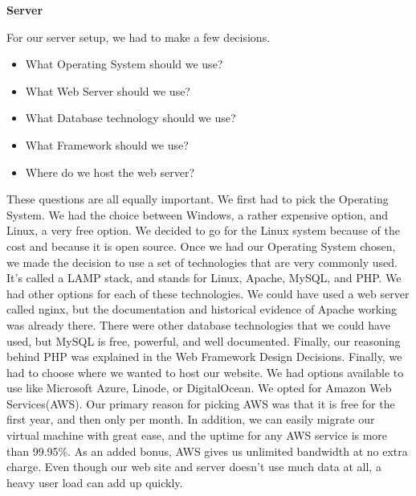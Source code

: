 \documentclass{report}
\begin{document}
\begin{center}
	\textbf{Server}
\end{center}
\indent
For our server setup, we had to make a few decisions.
\begin{itemize}
	\item What Operating System should we use?
	\item What Web Server should we use?
	\item What Database technology should we use?
	\item What Framework should we use?
	\item Where do we host the web server?
\end{itemize}
\indent
These questions are all equally important. We first had to pick the Operating System. We had the choice between Windows, a rather expensive option, and Linux, a very free option. We decided to go for the Linux system because of the cost and because it is open source.
\newline
\indent
Once we had our Operating System chosen, we made the decision to use a set of technologies that are very commonly used. It's called a LAMP stack, and stands for Linux, Apache, MySQL, and PHP. We had other options for each of these technologies. We could have used a web server called nginx, but the documentation and historical evidence of Apache working was already there. There were other database technologies that we could have used, but MySQL is free, powerful, and well documented. Finally, our reasoning behind PHP was explained in the Web Framework Design Decisions.
\newline
\indent
Finally, we had to choose where we wanted to host our website. We had options available to use like Microsoft Azure, Linode, or DigitalOcean. We opted for Amazon Web Services(AWS).
\newline
\indent
Our primary reason for picking AWS was that it is free for the first year, and then only  per month. In addition, we can easily migrate our virtual machine with great ease, and the uptime for any AWS service is more than 99.95\%. As an added bonus, AWS gives us unlimited bandwidth at no extra charge. Even though our web site and server doesn't use much data at all, a heavy user load can add up quickly.
\newpage
\end{document}
